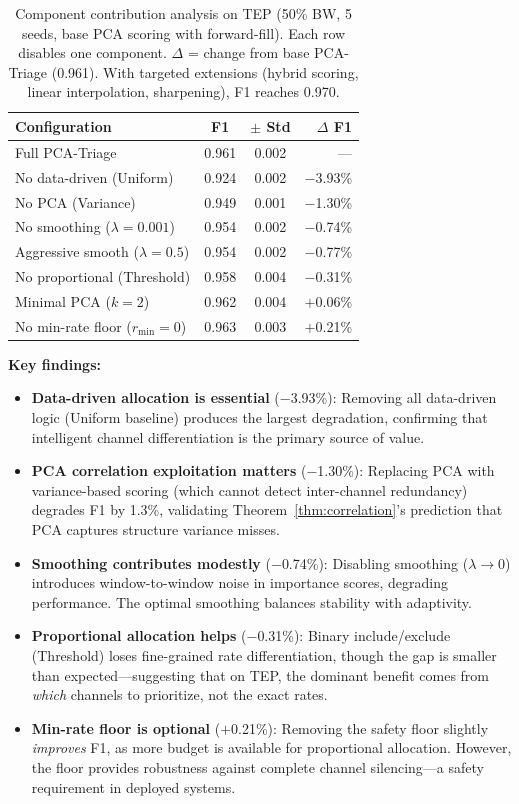 \documentclass[journal]{IEEEtran}
\begin{document}
\begin{table}[t]
\centering
\caption{Component contribution analysis on TEP (50\% BW, 5 seeds, base PCA scoring with forward-fill). Each row disables one component. $\Delta$ = change from base PCA-Triage (0.961). With targeted extensions (hybrid scoring, linear interpolation, sharpening), F1 reaches 0.970.}
\begin{tabular}{@{}lccr@{}}
\toprule
\textbf{Configuration} & \textbf{F1} & \textbf{$\pm$ Std} & \textbf{$\Delta$ F1} \\
\midrule
Full PCA-Triage & 0.961 & 0.002 & --- \\
\midrule
No data-driven (Uniform) & 0.924 & 0.002 & $-$3.93\% \\
No PCA (Variance) & 0.949 & 0.001 & $-$1.30\% \\
No smoothing ($\lambda{=}0.001$) & 0.954 & 0.002 & $-$0.74\% \\
Aggressive smooth ($\lambda{=}0.5$) & 0.954 & 0.002 & $-$0.77\% \\
No proportional (Threshold) & 0.958 & 0.004 & $-$0.31\% \\
Minimal PCA ($k{=}2$) & 0.962 & 0.004 & $+$0.06\% \\
No min-rate floor ($r_{\min}{=}0$) & 0.963 & 0.003 & $+$0.21\% \\
\bottomrule
\end{tabular}
\label{tab:component}
\end{table}

\textbf{Key findings:}
\begin{itemize}[leftmargin=*]
\item \textbf{Data-driven allocation is essential} ($-$3.93\%): Removing all data-driven logic (Uniform baseline) produces the largest degradation, confirming that intelligent channel differentiation is the primary source of value.
\item \textbf{PCA correlation exploitation matters} ($-$1.30\%): Replacing PCA with variance-based scoring (which cannot detect inter-channel redundancy) degrades F1 by 1.3\%, validating Theorem~\ref{thm:correlation}'s prediction that PCA captures structure variance misses.
\item \textbf{Smoothing contributes modestly} ($-$0.74\%): Disabling smoothing ($\lambda \to 0$) introduces window-to-window noise in importance scores, degrading performance. The optimal smoothing balances stability with adaptivity.
\item \textbf{Proportional allocation helps} ($-$0.31\%): Binary include/exclude (Threshold) loses fine-grained rate differentiation, though the gap is smaller than expected---suggesting that on TEP, the dominant benefit comes from \textit{which} channels to prioritize, not the exact rates.
\item \textbf{Min-rate floor is optional} ($+$0.21\%): Removing the safety floor slightly \textit{improves} F1, as more budget is available for proportional allocation. However, the floor provides robustness against complete channel silencing---a safety requirement in deployed systems.
\end{itemize}
\end{document}
